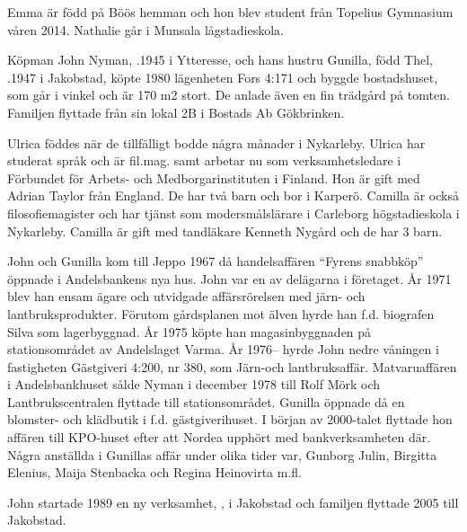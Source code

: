 Emma är född på Böös hemman och hon blev student från Topelius Gymnasium våren 2014. Nathalie går i Munsala lågstadieskola.


Köpman John Nyman, .1945 i Ytteresse, och hans hustru Gunilla, född Thel, .1947 i Jakobstad, köpte 1980 lägenheten Fors 4:171 och byggde bostadshuset, som går i vinkel och är 170 m2 stort. De anlade även en fin trädgård på tomten. Familjen flyttade från sin lokal 2B i Bostads Ab Gökbrinken.
\begin{jhchildren}
  \item {}
  \item {}
\end{jhchildren}
Ulrica föddes när de tillfälligt bodde några månader i Nykarleby. Ulrica har studerat språk och är fil.mag. samt arbetar nu som verksamhetsledare i Förbundet för Arbets- och Medborgarinstituten i Finland. Hon är gift med Adrian Taylor från England. De har två barn och bor i Karperö. Camilla är också filosofiemagister och har tjänst som modersmålslärare i Carleborg högstadieskola i Nykarleby. Camilla är gift med tandläkare Kenneth Nygård och de har 3 barn.

John och Gunilla kom till Jeppo 1967 då handelsaffären ``Fyrens snabbköp'' öppnade i Andelsbankens nya hus. John var en av delägarna i företaget. År 1971 blev han ensam ägare och utvidgade affärsrörelsen med järn- och lantbruksprodukter. Förutom gårdsplanen mot älven hyrde han f.d. biografen Silva som lagerbyggnad. År 1975 köpte han magasinbyggnaden på stationsområdet av Andelslaget Varma. År 1976-- hyrde John nedre våningen i fastigheten Gästgiveri 4:200, nr 380, som Järn-och lantbruksaffär. Matvaruaffären i Andelsbankhuset sålde Nyman i december 1978 till Rolf Mörk och Lantbrukscentralen flyttade till stationsområdet. Gunilla öppnade då en blomster- och klädbutik i f.d. gästgiverihuset. I början av 2000-talet flyttade hon affären till KPO-huset efter att Nordea upphört med bankverksamheten där. Några anställda i Gunillas affär under olika tider var, Gunborg Julin, Birgitta Elenius, Maija Stenbacka och Regina Heinovirta m.fl.

John startade 1989 en ny verksamhet, , i Jakobstad och familjen flyttade 2005 till Jakobstad.



